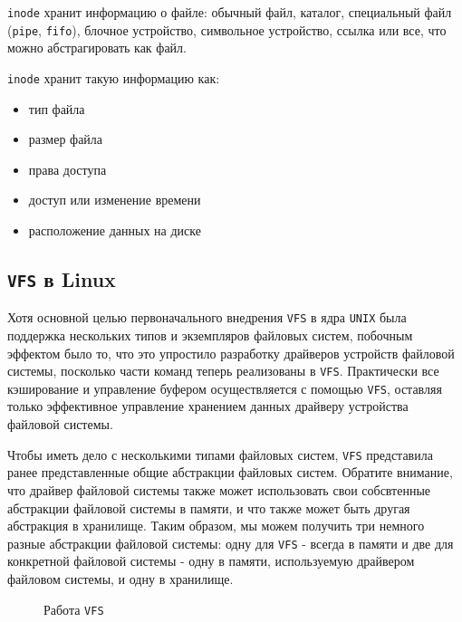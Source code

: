 \documentclass{article}
\begin{document}
    \texttt{inode} хранит информацию о файле: обычный файл, каталог, специальный
    файл (\texttt{pipe}, \texttt{fifo}), блочное устройство, символьное 
    устройство, ссылка или все, что можно абстрагировать как файл.

    \texttt{inode} хранит такую информацию как:

    \begin{itemize}
        \item тип файла
        \item размер файла
        \item права доступа
        \item доступ или изменение времени
        \item расположение данных на диске
    \end{itemize}

    \subsection{\texttt{VFS} в Linux}
    Хотя основной целью первоначального внедрения \texttt{VFS} в ядра 
    \texttt{UNIX} была поддержка нескольких типов и экземпляров файловых
    систем, побочным эффектом было то, что это упростило разработку
    драйверов устройств файловой системы, посколько части команд теперь
    реализованы в \texttt{VFS}. Практически все кэширование и управление
    буфером осуществляется с помощью \texttt{VFS}, оставляя только
    эффективное управление хранением данных драйверу устройства файловой
    системы.

    Чтобы иметь дело с несколькими типами файловых систем, \texttt{VFS}
    представила ранее представленные общие абстракции файловых систем. Обратите
    внимание, что драйвер файловой системы также может использовать свои
    собсвтенные абстракции файловой системы в памяти, и что также может быть
    другая абстракция в хранилище. Таким образом, мы можем получить три немного
    разные абстракции файловой системы: одну для \texttt{VFS} - всегда в памяти
    и две для конкретной файловой системы - одну в памяти, используемую драйвером
    файловом системы, и одну в хранилище.

    \begin{figure}[h!]
        \caption{Работа \texttt{VFS}}
    \end{figure}
\end{document}
